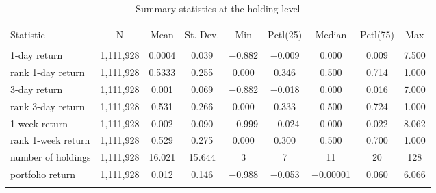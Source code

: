 
\begin{table}[!htbp] \centering 
  \caption{Summary statistics at the holding level} 
  \label{} 
\begin{tabular}{@{\extracolsep{5pt}}lcccccccc} 
\\[-1.8ex]\hline 
\hline \\[-1.8ex] 
Statistic & \multicolumn{1}{c}{N} & \multicolumn{1}{c}{Mean} & \multicolumn{1}{c}{St. Dev.} & \multicolumn{1}{c}{Min} & \multicolumn{1}{c}{Pctl(25)} & \multicolumn{1}{c}{Median} & \multicolumn{1}{c}{Pctl(75)} & \multicolumn{1}{c}{Max} \\ 
\hline \\[-1.8ex] 
1-day return & 1,111,928 & 0.0004 & 0.039 & $-$0.882 & $-$0.009 & 0.000 & 0.009 & 7.500 \\ 
rank 1-day return & 1,111,928 & 0.5333 & 0.255 & 0.000 & 0.346 & 0.500 & 0.714 & 1.000 \\ 
3-day return & 1,111,928 & 0.001 & 0.069 & $-$0.882 & $-$0.018 & 0.000 & 0.016 & 7.000 \\ 
rank 3-day return & 1,111,928 & 0.531 & 0.266 & 0.000 & 0.333 & 0.500 & 0.724 & 1.000 \\ 
1-week return & 1,111,928 & 0.002 & 0.090 & $-$0.999 & $-$0.024 & 0.000 & 0.022 & 8.062 \\ 
rank 1-week return & 1,111,928 & 0.529 & 0.275 & 0.000 & 0.300 & 0.500 & 0.700 & 1.000 \\ 
number of holdings & 1,111,928 & 16.021 & 15.644 & 3 & 7 & 11 & 20 & 128 \\ 
portfolio return & 1,111,928 & 0.012 & 0.146 & $-$0.988 & $-$0.053 & $-$0.00001 & 0.060 & 6.066 \\ 
\hline \\[-1.8ex] 
\end{tabular} 
\end{table} 

